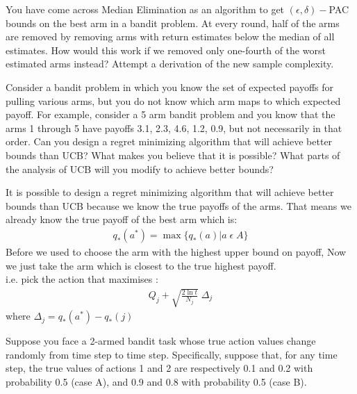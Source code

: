 \documentclass[addpoints,12pt,solution]{exam}
\begin{document}
\begin{questions}
\question[2] You have come across Median Elimination as an algorithm to get $(\epsilon, \delta)-$PAC bounds on the best arm in a bandit problem. At every round, half
of the arms are removed by removing arms with return estimates below
the median of all estimates. How would this work if we removed only
one-fourth of the worst estimated arms instead? Attempt a derivation of
the new sample complexity.

\begin{solution}
\end{solution}

\question[3] Consider a bandit problem in which you know the set of expected payoffs for pulling various arms, but you do not know which arm maps to which expected payoff. For example, consider a 5 arm bandit problem and you know that the arms 1 through 5 have payoffs 3.1, 2.3, 4.6, 1.2, 0.9, but not necessarily in that order. Can you design a regret minimizing algorithm that will achieve better bounds than UCB? What makes you believe that it is possible? What parts of the analysis of UCB will you modify to achieve better bounds?
\begin{solution}
It is possible to design a regret minimizing algorithm that will achieve better bounds than UCB because we know the true payoffs of the arms. That means we already know the true payoff of the best arm which is:
\begin{align}
    q_{*}(a^*) = \max\{q_{*}(a)| a \; \epsilon \; A\} 
\end{align}
Before we used to choose the arm with the highest upper bound on payoff, Now we just take the arm which is closest to the true highest payoff.\\
i.e. pick the action that maximises :\\ 
\begin{align}
Q_{j} + \sqrt{\frac{2\ln{t}}{N_{j}}}\; \Delta_{j}    
\end{align}
where $\Delta_{j} = q_{*}(a^*) - q_{*}(j)$

\end{solution}

\question[3]Suppose you face a 2-armed bandit task whose true action values change randomly from time step to time step. Specifically, suppose that, for any time step, the true values of actions 1 and 2 are respectively 0.1 and 0.2 with probability 0.5 (case A), and 0.9 and 0.8 with probability 0.5 (case B). 


\end{questions}
\end{document}
